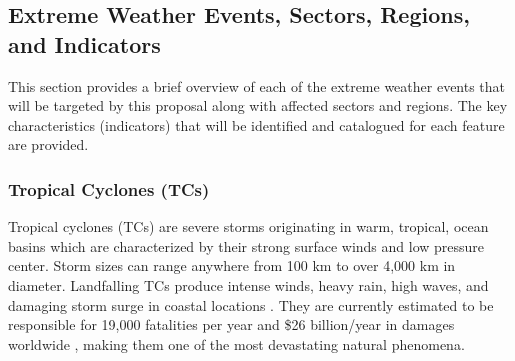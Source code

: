 \documentclass[11pt]{article}
\newcommand\citep{\cite}
\begin{document}


\subsection{Extreme Weather Events, Sectors, Regions, and Indicators} \label{sec:ExtremeWeather}

This section provides a brief overview of each of the extreme weather events that will be targeted by this proposal along with affected sectors and regions.  The key characteristics (indicators) that will be identified and catalogued for each feature are provided.

\subsubsection*{Tropical Cyclones (TCs)}

Tropical cyclones (TCs) are severe storms originating in warm, tropical, ocean basins which are characterized by their strong surface winds and low pressure center. Storm sizes can range anywhere from 100 km to over 4,000 km in diameter. Landfalling TCs produce intense winds, heavy rain, high waves, and damaging storm surge in coastal locations \citep{EmanuelDivineWind}. They are currently estimated to be responsible for 19,000 fatalities per year and \$26 billion/year in damages worldwide \citep{Mendelsohn2012}, making them one of the most devastating natural phenomena.

\end{document}
